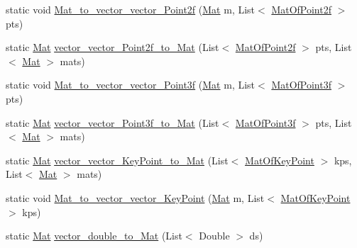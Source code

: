\begin{DoxyCompactItemize}
\item 
static void \mbox{\hyperlink{classorg_1_1opencv_1_1utils_1_1_converters_ac3c0c196ccf5be122e53e5e8d5d6dc55}{Mat\+\_\+to\+\_\+vector\+\_\+vector\+\_\+\+Point2f}} (\mbox{\hyperlink{classorg_1_1opencv_1_1core_1_1_mat}{Mat}} m, List$<$ \mbox{\hyperlink{classorg_1_1opencv_1_1core_1_1_mat_of_point2f}{Mat\+Of\+Point2f}} $>$ pts)
\item 
static \mbox{\hyperlink{classorg_1_1opencv_1_1core_1_1_mat}{Mat}} \mbox{\hyperlink{classorg_1_1opencv_1_1utils_1_1_converters_a11af1f37b624f4a821808cba27be6774}{vector\+\_\+vector\+\_\+\+Point2f\+\_\+to\+\_\+\+Mat}} (List$<$ \mbox{\hyperlink{classorg_1_1opencv_1_1core_1_1_mat_of_point2f}{Mat\+Of\+Point2f}} $>$ pts, List$<$ \mbox{\hyperlink{classorg_1_1opencv_1_1core_1_1_mat}{Mat}} $>$ mats)
\item 
static void \mbox{\hyperlink{classorg_1_1opencv_1_1utils_1_1_converters_af5e4b8a5fc7131ed3ae29e8dc6288291}{Mat\+\_\+to\+\_\+vector\+\_\+vector\+\_\+\+Point3f}} (\mbox{\hyperlink{classorg_1_1opencv_1_1core_1_1_mat}{Mat}} m, List$<$ \mbox{\hyperlink{classorg_1_1opencv_1_1core_1_1_mat_of_point3f}{Mat\+Of\+Point3f}} $>$ pts)
\item 
static \mbox{\hyperlink{classorg_1_1opencv_1_1core_1_1_mat}{Mat}} \mbox{\hyperlink{classorg_1_1opencv_1_1utils_1_1_converters_a8cb0b14321b7c5556ae10a095a1486ff}{vector\+\_\+vector\+\_\+\+Point3f\+\_\+to\+\_\+\+Mat}} (List$<$ \mbox{\hyperlink{classorg_1_1opencv_1_1core_1_1_mat_of_point3f}{Mat\+Of\+Point3f}} $>$ pts, List$<$ \mbox{\hyperlink{classorg_1_1opencv_1_1core_1_1_mat}{Mat}} $>$ mats)
\item 
static \mbox{\hyperlink{classorg_1_1opencv_1_1core_1_1_mat}{Mat}} \mbox{\hyperlink{classorg_1_1opencv_1_1utils_1_1_converters_a5cf4238136a1c5db0bf85bf1ebf7a488}{vector\+\_\+vector\+\_\+\+Key\+Point\+\_\+to\+\_\+\+Mat}} (List$<$ \mbox{\hyperlink{classorg_1_1opencv_1_1core_1_1_mat_of_key_point}{Mat\+Of\+Key\+Point}} $>$ kps, List$<$ \mbox{\hyperlink{classorg_1_1opencv_1_1core_1_1_mat}{Mat}} $>$ mats)
\item 
static void \mbox{\hyperlink{classorg_1_1opencv_1_1utils_1_1_converters_a62dd051e1411dc27034a7d27894bc67b}{Mat\+\_\+to\+\_\+vector\+\_\+vector\+\_\+\+Key\+Point}} (\mbox{\hyperlink{classorg_1_1opencv_1_1core_1_1_mat}{Mat}} m, List$<$ \mbox{\hyperlink{classorg_1_1opencv_1_1core_1_1_mat_of_key_point}{Mat\+Of\+Key\+Point}} $>$ kps)
\item 
static \mbox{\hyperlink{classorg_1_1opencv_1_1core_1_1_mat}{Mat}} \mbox{\hyperlink{classorg_1_1opencv_1_1utils_1_1_converters_a539f68ebb4ea77fbcb64ba23cabdf713}{vector\+\_\+double\+\_\+to\+\_\+\+Mat}} (List$<$ Double $>$ ds)

\end{DoxyCompactItemize}

